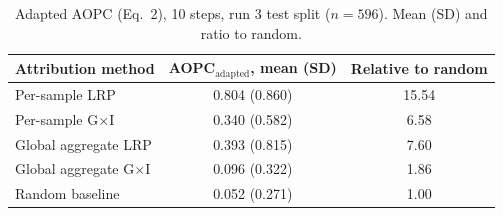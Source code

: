 \begin{table}[ht]
\centering
\caption{Adapted AOPC (Eq.~2), 10 steps, run 3 test split ($n=596$). Mean (SD) and ratio to random.}
\label{tab:aopc}
\begin{tabular}{lcc}
\toprule
Attribution method & AOPC$_{\text{adapted}}$, mean (SD) & Relative to random \\
\midrule
Per-sample LRP & 0.804 (0.860) & 15.54 \\
Per-sample G$\times$I & 0.340 (0.582) & 6.58 \\
Global aggregate LRP & 0.393 (0.815) & 7.60 \\
Global aggregate G$\times$I & 0.096 (0.322) & 1.86 \\
\midrule
Random baseline & 0.052 (0.271) & 1.00 \\
\bottomrule
\end{tabular}
\end{table}
